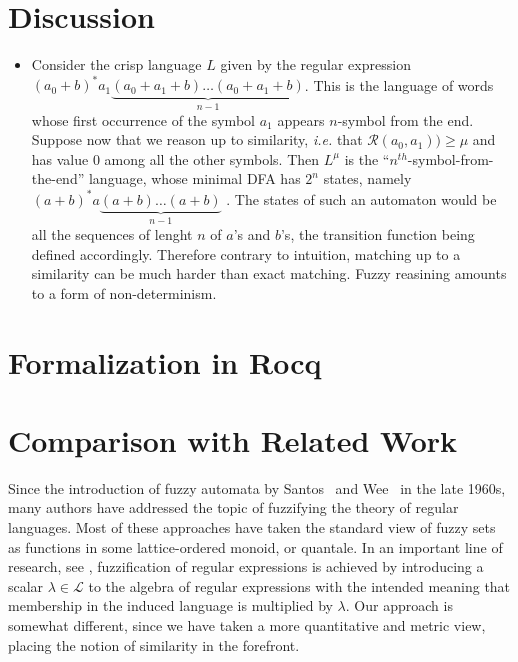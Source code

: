 \documentclass{article}
\def\ie{{\em i.e. }}
\begin{document}
\section{Discussion}
\begin{itemize}
\item Consider the crisp language $L$ given by the regular expression $(a_0+b)^* a_1\underbrace{(a_0+a_1+b)\ldots (a_0+a_1+b)}_{n-1}$. This is the language of words whose first occurrence of the symbol $a_1$ appears $n$-symbol from the end. Suppose now that we reason up to similarity, \ie  that $\mathcal R(a_0,a_1))\geq \mu$ and has value 0 among all the other symbols. Then $L^\mu$ is the “$n^{th}$-symbol-from-the-end” language, whose minimal DFA has $2^{n}$ states, namely $(a+b)^* a\underbrace{(a+b)\ldots (a+b)}_{n-1}$ . The states of such an automaton would be all the sequences of lenght $n$ of $a$'s and $b$'s, the transition function being defined accordingly.  Therefore contrary to intuition, matching up to a similarity can be much harder than exact matching. Fuzzy reasining amounts to a form of non-determinism.
\end{itemize}

\section{Formalization in Rocq}
\section{Comparison with Related Work}
Since the introduction of fuzzy automata by Santos~\cite{Santos68} and Wee~\cite{Wee67,WeeFu69} in the late 1960s, many authors have addressed the topic of fuzzifying the theory of regular languages. Most of these approaches have taken the standard view of fuzzy sets as functions in some lattice-ordered monoid, or quantale. In an important line of research, see \cite{LP06,SC12,GJT17}, fuzzification of regular expressions is achieved by introducing a scalar $\lambda\in \mathcal L$ to the algebra of regular expressions with the intended meaning that membership in the induced language is multiplied by $\lambda$. Our approach is somewhat different, since we have taken a more quantitative and metric view, placing the notion of similarity in the forefront.
\end{document}
